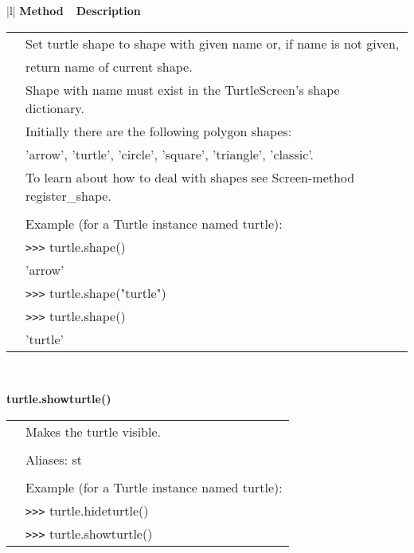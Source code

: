 \begin{center}
{\small
\begin{tabular}{|l|} \hline
{\bf Method~~Description}  \\ \hline\hline 
   \begin{tabular}{p{0.25in}p{4in}}
   
&        Set turtle shape to shape with given name or, if name is not given, \\
&        return name of current shape. \\
&        Shape with name must exist in the TurtleScreen's shape dictionary. \\
&        Initially there are the following polygon shapes: \\
&        'arrow', 'turtle', 'circle', 'square', 'triangle', 'classic'. \\
&        To learn about how to deal with shapes see Screen-method register\_shape. \\
&  \\
&        Example (for a Turtle instance named turtle): \\
&        \verb+>+\verb+>+\verb+>+ turtle.shape() \\
&        'arrow' \\
&        \verb+>+\verb+>+\verb+>+ turtle.shape("turtle") \\
&        \verb+>+\verb+>+\verb+>+ turtle.shape() \\
&        'turtle' \\
\end{tabular} \\ \hline


{\bf    turtle.showturtle()} \\
   \begin{tabular}{p{0.25in}p{4in}}
&        Makes the turtle visible. \\
&  \\
&        Aliases: st \\
&  \\
&        Example (for a Turtle instance named turtle): \\
&        \verb+>+\verb+>+\verb+>+ turtle.hideturtle() \\
&        \verb+>+\verb+>+\verb+>+ turtle.showturtle() \\
\end{tabular} \\ \hline


\end{tabular}}
\end{center}
